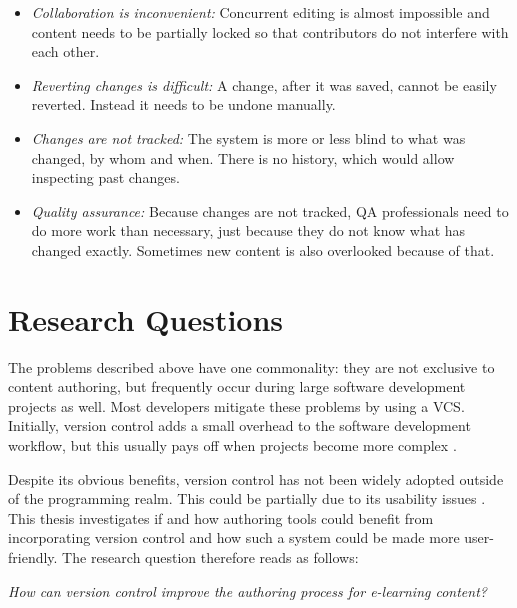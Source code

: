 \begin{itemize}
  \item \textit{Collaboration is inconvenient:} Concurrent editing is almost impossible and content needs to be partially locked so that contributors do not interfere with each other.
  \item \textit{Reverting changes is difficult:} A change, after it was saved, cannot be easily reverted. Instead it needs to be undone manually.
  \item \textit{Changes are not tracked:} The system is more or less blind to what was changed, by whom and when. There is no history, which would allow inspecting past changes.
  \item \textit{Quality assurance:} Because changes are not tracked, \ac{QA} professionals need to do more work than necessary, just because they do not know what has changed exactly. Sometimes new content is also overlooked because of that.
\end{itemize}


\section{Research Questions} %
The problems described above have one commonality: they are not exclusive to content authoring, but frequently occur during large software development projects as well. Most developers mitigate these problems by using a \ac{VCS}. Initially, version control adds a small overhead to the software development workflow, but this usually pays off when projects become more complex \cite{spinellis_version_2005}.

Despite its obvious benefits, version control has not been widely adopted outside of the programming realm. This could be partially due to its usability issues  \cite{church_case_2014} \cite{perez_de_rosso_whats_2013}.
This thesis investigates if and how authoring tools could benefit from incorporating version control and how such a system could be made more user-friendly. The research question therefore reads as follows:

\begin{center}
 \textit{How can version control improve the authoring process for e-learning content?}
\end{center}

